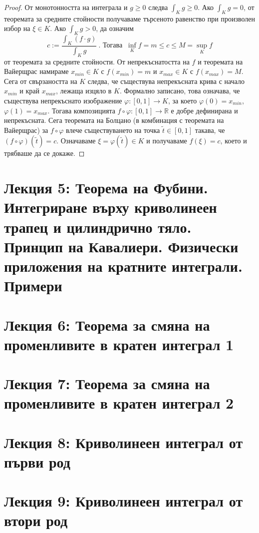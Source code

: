 \documentclass[11pt]{article}
\numberwithin{equation}{section}
\numberwithin{figure}{section}
\numberwithin{table}{section}
\theoremstyle{plain}
\theoremstyle{definition}
\theoremstyle{remark}
\theoremstyle{definition}
\theoremstyle{remark}
\theoremstyle{plain}
\theoremstyle{definition}
\theoremstyle{definition}
\theoremstyle{plain}
\theoremstyle{plain}
\theoremstyle{plain}
\theoremstyle{definition}
\theoremstyle{plain}
\newcommand*{\R}{\mathbb{R}}
\begin{document}
\begin{proof} 
От монотонността на интеграла и $g\ge 0$ следва $\int_K g \ge 0$. Ако  $\int_K g = 0$, от теоремата за средните стойности получаваме търсеното равенство при произволен избор на $\xi\in K$. Ако $\int_K g > 0$, да означим
$$c:=\frac{\int_K (f\cdot g)}{\int_K g} \ . \mbox{ Тогава } \ \inf_K f =m \le c\le  M= \sup_K f$$
от теоремата за средните стойности. От непрекъснатостта на $f$ и теоремата на Вайерщрас намираме $x_{min}\in K$ с $f(x_{min})=m$ и $x_{max}\in K$ с $f(x_{max})=M$. Сега от свързаността на $K$ следва, че съществува непрекъсната крива с начало $x_{min}$ и край $x_{max}$, лежаща изцяло в $K$. Формално записано, това означава, че съществува непрекъснато изображение $\varphi :[0,1]\longrightarrow K$, за което $\varphi (0)=x_{min}$, $\varphi(1)=x_{max}$. Тогава композицията $f\circ \varphi :[0,1]\longrightarrow \R$ е добре дефинирана и непрекъсната. Сега теоремата на Болцано (в комбинация с теоремата на Вайерщрас) за $f\circ \varphi$ влече съществуването на точка $\tilde{t}\in [0,1]$ такава, че $(f\circ \varphi)(\tilde{t})=c$. Означаваме $\xi =\varphi(\tilde{t})\in K$ и получаваме $f(\xi)=c$, което и трябваше да се докаже. 
\end{proof}

\newpage


\section{Лекция 5: Теорема на Фубини. Интегриране върху криволинеен трапец и цилиндрично тяло. Принцип на Кавалиери. Физически приложения на кратните интеграли. Примери}

\section{Лекция 6: Теорема за смяна на променливите в кратен интеграл 1}

\section{Лекция 7: Теорема за смяна на променливите в кратен интеграл 2}

\section{Лекция 8: Криволинеен интеграл от първи род}

\section{Лекция 9: Криволинеен интеграл от втори род}
\end{document}
